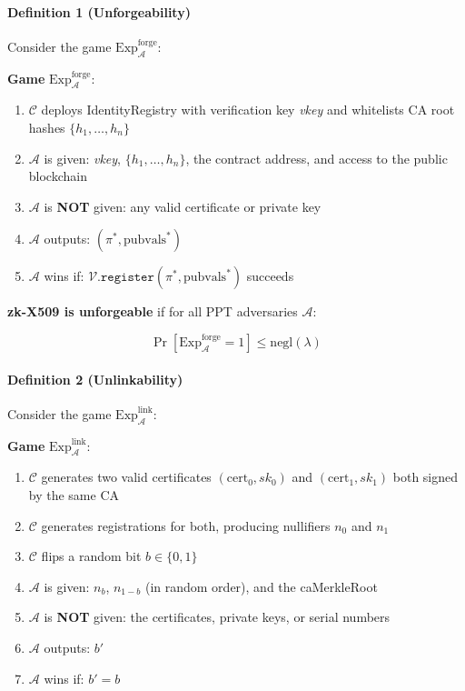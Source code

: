 \documentclass[11pt, a4paper]{article}
\begin{document}
\paragraph{Definition 1
(Unforgeability)}\label{definition-1-unforgeability}

Consider the game \(\text{Exp}_{\mathcal{A}}^{\text{forge}}\):

\begin{mdframed}[linewidth=0.5pt, innertopmargin=6pt, innerbottommargin=6pt]
\small
\textbf{Game} $\text{Exp}_{\mathcal{A}}^{\text{forge}}$:
\begin{enumerate}[nosep,leftmargin=1.5em]
\item $\mathcal{C}$ deploys IdentityRegistry with verification key \textit{vkey} and whitelists CA root hashes $\{h_1, \ldots, h_n\}$
\item $\mathcal{A}$ is given: \textit{vkey}, $\{h_1, \ldots, h_n\}$, the contract address, and access to the public blockchain
\item $\mathcal{A}$ is \textbf{NOT} given: any valid certificate or private key
\item $\mathcal{A}$ outputs: $(\pi^*, \text{pubvals}^*)$
\item $\mathcal{A}$ wins if: $\mathcal{V}.\texttt{register}(\pi^*, \text{pubvals}^*)$ succeeds
\end{enumerate}
\end{mdframed}

\textbf{zk-X509 is unforgeable} if for all PPT adversaries
\(\mathcal{A}\):

\[\Pr[\text{Exp}_{\mathcal{A}}^{\text{forge}} = 1] \leq \text{negl}(\lambda)\]

\paragraph{Definition 2
(Unlinkability)}\label{definition-2-unlinkability}

Consider the game \(\text{Exp}_{\mathcal{A}}^{\text{link}}\):

\begin{mdframed}[linewidth=0.5pt, innertopmargin=6pt, innerbottommargin=6pt]
\small
\textbf{Game} $\text{Exp}_{\mathcal{A}}^{\text{link}}$:
\begin{enumerate}[nosep,leftmargin=1.5em]
\item $\mathcal{C}$ generates two valid certificates $(\text{cert}_0, sk_0)$ and $(\text{cert}_1, sk_1)$ both signed by the same CA
\item $\mathcal{C}$ generates registrations for both, producing nullifiers $n_0$ and $n_1$
\item $\mathcal{C}$ flips a random bit $b \in \{0, 1\}$
\item $\mathcal{A}$ is given: $n_b$, $n_{1-b}$ (in random order), and the caMerkleRoot
\item $\mathcal{A}$ is \textbf{NOT} given: the certificates, private keys, or serial numbers
\item $\mathcal{A}$ outputs: $b'$
\item $\mathcal{A}$ wins if: $b' = b$
\end{enumerate}
\end{mdframed}
\end{document}
